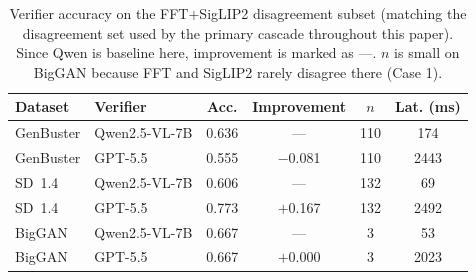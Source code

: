 \documentclass{ieeeaccess}
\begin{document}
\begin{table}[h]
\centering
\small
\setlength{\tabcolsep}{3pt}  %
\caption{Verifier accuracy on the FFT+SigLIP2 disagreement subset (matching the
disagreement set used by the primary cascade throughout this paper). Since Qwen is
baseline here, improvement is marked as ---. $n$ is small on BigGAN because FFT and
SigLIP2 rarely disagree there (Case 1).}
\label{tab:verifier_comparison}
\begin{tabular}{llcccc}
\toprule
Dataset & Verifier & Acc. & Improvement & $n$ & Lat. (ms) \\
\midrule
GenBuster & Qwen2.5-VL-7B  & 0.636 & ---        & 110 & 174 \\
GenBuster & GPT-5.5        & 0.555 & $-$0.081   & 110 & 2443 \\
\midrule
SD~1.4    & Qwen2.5-VL-7B  & 0.606 & ---        & 132 & 69 \\
SD~1.4    & GPT-5.5        & 0.773 & $+$0.167   & 132 & 2492 \\
\midrule
BigGAN    & Qwen2.5-VL-7B  & 0.667 & ---        &   3 & 53 \\
BigGAN    & GPT-5.5        & 0.667 & $+$0.000   &   3 & 2023 \\
\bottomrule
\end{tabular}
\end{table}
\end{document}
